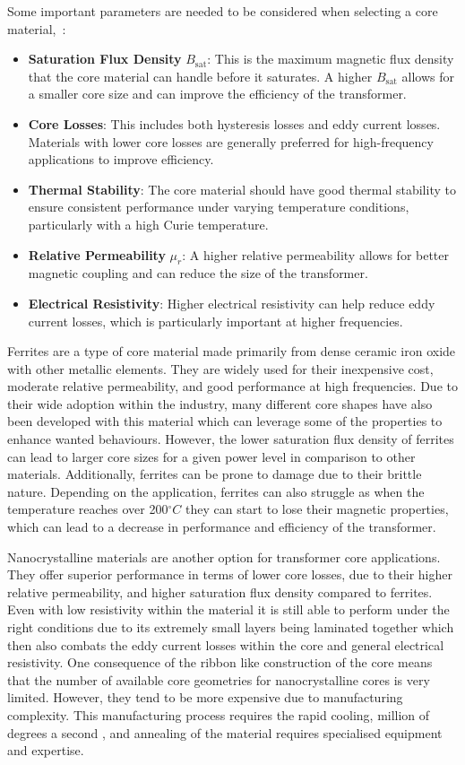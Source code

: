 \documentclass[a4paper, 12pt, titlepage]{report}
\begin{document}
Some important parameters are needed to be considered when selecting a core material,~\cite{week4Lecture}:
\begin{itemize}
    \item \textbf{Saturation Flux Density} \(B_{\mathrm{sat}}\): This is the maximum magnetic flux density that the core material can handle before it saturates. A higher \(B_{\mathrm{sat}}\) allows for a smaller core size and can improve the efficiency of the transformer.
    \item \textbf{Core Losses}: This includes both hysteresis losses and eddy current losses. Materials with lower core losses are generally preferred for high-frequency applications to improve efficiency.
    \item \textbf{Thermal Stability}: The core material should have good thermal stability to ensure consistent performance under varying temperature conditions, particularly with a high Curie temperature.
    \item \textbf{Relative Permeability} \(\mu_r\): A higher relative permeability allows for better magnetic coupling and can reduce the size of the transformer.
    \item \textbf{Electrical Resistivity}: Higher electrical resistivity can help reduce eddy current losses, which is particularly important at higher frequencies.
\end{itemize}

Ferrites are a type of core material made primarily from dense ceramic iron oxide with other metallic elements. They are widely used for their inexpensive cost, moderate relative permeability, and good performance at high frequencies. Due to their wide adoption within the industry, many different core shapes have also been developed with this material which can leverage some of the properties to enhance wanted behaviours. However, the lower saturation flux density of ferrites can lead to larger core sizes for a given power level in comparison to other materials. Additionally, ferrites can be prone to damage due to their brittle nature. Depending on the application, ferrites can also struggle as when the temperature reaches over 200\(^\circ C\) they can start to lose their magnetic properties, which can lead to a decrease in performance and efficiency of the transformer.

Nanocrystalline materials are another option for transformer core applications. They offer superior performance in terms of lower core losses, due to their higher relative permeability, and higher saturation flux density compared to ferrites. Even with low resistivity within the material it is still able to perform under the right conditions due to its extremely small layers being laminated together which then also combats the eddy current losses within the core and general electrical resistivity. One consequence of the ribbon like construction of the core means that the number of available core geometries for nanocrystalline cores is very limited. However, they tend to be more expensive due to manufacturing complexity. This manufacturing process requires the rapid cooling, million of degrees a second \cite{nanocrystallineManufacture}, and annealing of the material requires specialised equipment and expertise.
\end{document}
